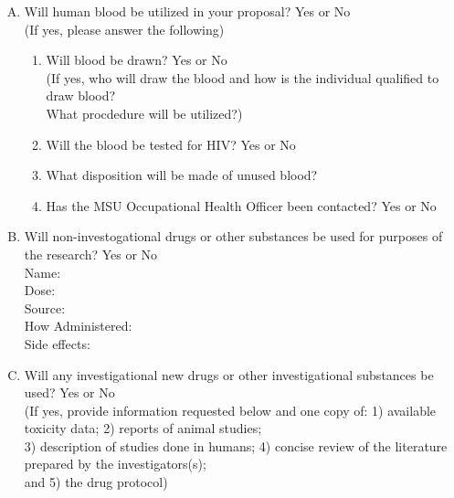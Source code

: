 \documentclass{article}
\begin{document}
\begin{enumerate}[I.]
\begin{enumerate}[A.]
\begin{enumerate}[1.]
        \end{enumerate}
        \item Will human blood be utilized in your proposal? Yes or No \\
        (If yes, please answer the following)

        \begin{enumerate}[1.]
            \item Will blood be drawn? Yes or No \\
            (If yes, who will draw the blood and how is the individual qualified to draw blood? \\
            What procdedure will be utilized?)\\
        
            \item Will the blood be tested for HIV? Yes or No \\
            
            \item What disposition will be made of unused blood? \\
            
            \item Has the MSU Occupational Health Officer been contacted? Yes or No \\

        \end{enumerate}
        \item Will non-investogational drugs or other substances be used for purposes of the research? Yes or No\\
        
        Name:\\
        Dose:\\
        Source:\\
        How Administered:\\
        Side effects:\\

        \item Will any investigational new drugs or other investigational substances be used? Yes or No \\
        (If yes, provide information requested below and one copy of: 1) available toxicity data; 2) reports of animal studies;\\
        3) description of studies done in humans; 4) concise review of the literature prepared by the investigators(s); \\
        and 5) the drug protocol)\\


\end{enumerate}
\end{enumerate}
\end{document}
